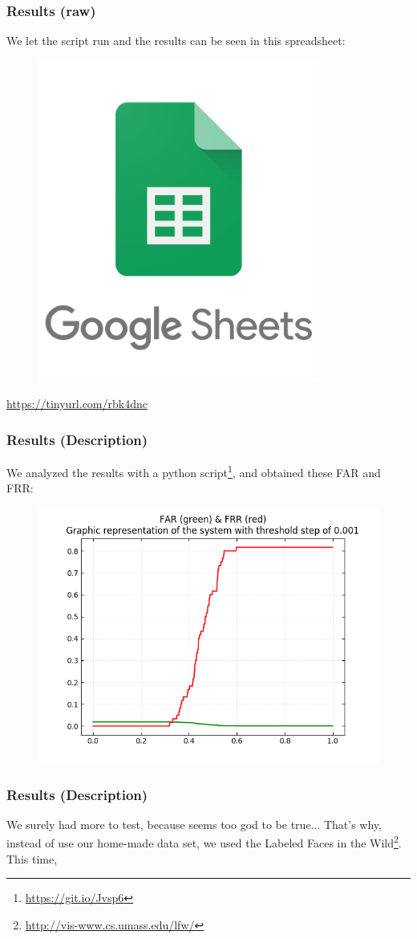 \begin{frame} \frametitle{Results (raw)}
	
	\begin{center}
		We let the script run and the results can be seen in this spreadsheet:
		\begin{figure}[H]
			\includegraphics[width=.3\textwidth]{img/sheets}
		\end{figure}
		{\color{red} \url{https://tinyurl.com/rbk4dnc}}	
	\end{center}
	\vfill

\end{frame}

\begin{frame} \frametitle{Results (Description)}

	We analyzed the results with a python script\footnote{{\color{red} 
	\url{https://git.io/Jvsp6}}}, and obtained these FAR and FRR:
	
	\vfill
	\begin{center}
		\begin{figure}[H]
			\includegraphics[width=.7\textwidth]{img/far-frr}
		\end{figure}
	\end{center}
	\vfill

\end{frame}

\begin{frame} \frametitle{Results (Description)}

	\vfill
	We surely had more to test, because seems too god to be true...
	\vfill
	That's why, instead of use our home-made data set, we used the
	Labeled Faces in the Wild\footnote{{\color{red} 
	\url{http://vis-www.cs.umass.edu/lfw/}}}.
	\vfill
	This time, 
	
	

\end{frame}
